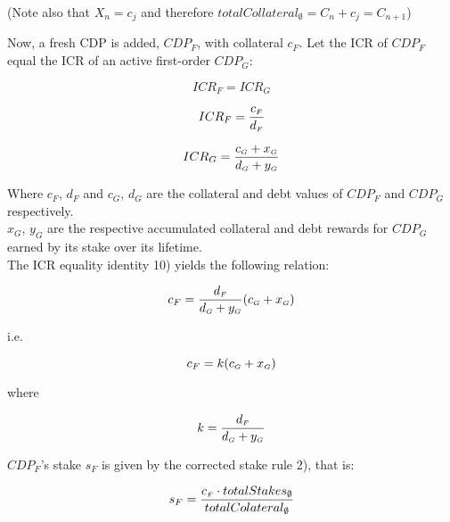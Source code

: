 \documentclass[reqno]{article}
\begin{document}
\bigskip
(Note also that $X_n=c_j$ and therefore $totalCollateral_\emptyset=C_n+c_j=C_{n+1}$)

\bigskip
Now, a fresh CDP is added, $CDP_F$, with collateral $c_F$.  Let the ICR of $CDP_F$ equal the ICR of an active first-order $CDP_G$:

\begin{equation} 
    ICR_F=ICR_G
\end{equation}

\begin{equation} 
    ICR_F=\frac{c_\mathsmaller{F}}{d_\mathsmaller{F}}
\end{equation}

\begin{equation} 
    ICR_G=\frac{c_\mathsmaller{G}+x_\mathsmaller{G}}{d_\mathsmaller{G}+y_\mathsmaller{G}}
\end{equation}

\bigskip
Where $c_F$, $d_F$ and $c_G$, $d_G$ are the collateral and debt values of $CDP_F$ and $CDP_G$ respectively.\\

$x_G$, $y_G$ are the respective accumulated collateral and debt rewards for $CDP_G$ earned by its stake over its lifetime.\\

The ICR equality identity 10) yields the following relation:

\begin{equation} 
        c_F=\frac{d_\mathsmaller{F}}{d_\mathsmaller{G}+y_\mathsmaller{G}}(c_\mathsmaller{G}+x_\mathsmaller{G})
\end{equation}

\bigskip
i.e.

\begin{equation} 
    c_F=k(c_\mathsmaller{G}+x_\mathsmaller{G})
\end{equation}

\bigskip
where

\begin{equation} 
    k=\frac{d_\mathsmaller{F}}{d_\mathsmaller{G}+y_\mathsmaller{G}}
\end{equation}

\bigskip
$CDP_F$’s stake $s_F$ is given by the corrected stake rule 2), that is:

\begin{equation} 
    s_F=\frac{c_\mathsmaller{F} \cdot totalStakes_\emptyset}{totalColateral_\emptyset}
\end{equation}
\end{document}
